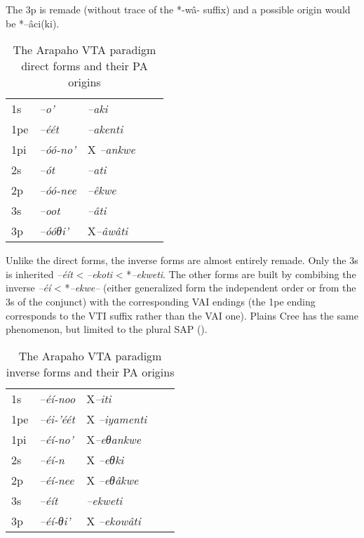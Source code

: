 \documentclass[twoside,a4paper,11pt]{article}
\newcommand{\ipa}[1]{{\phon\textit{#1}}}
\newcommand{\Σ}{\greek{Σ}}
\begin{document}
The 3p is remade (without trace of the *-wâ- suffix) and a possible origin would be *--âci(ki).

\begin{table}[H]
\caption{The Arapaho VTA paradigm direct forms and their PA origins}
\centering \label{tab:vta.1}
\begin{tabular}{lllll}
\toprule
 1s & 	\ipa{--o'} & 	\ipa{--aki} & 		\\		
1pe & 	\ipa{--éét} & 	\ipa{--akenti} & 		\\		
1pi & 	\ipa{--óó-no'} & X	\ipa{--ankwe} & 		\\		
\midrule
2s & 	\ipa{--ót} & 	\ipa{--ati} & 		\\		
2p & 	\ipa{--óó-nee} & 	\ipa{--êkwe} & 		\\		
\midrule
3s & 	\ipa{--oot} & 	\ipa{--âti} & 		\\		
3p & 	\ipa{--óóθi'} & 	X\ipa{--âwâti} & 		\\		
\bottomrule
\end{tabular}
\end{table}

Unlike the direct forms, the inverse forms are almost entirely remade. Only the 3s is inherited 	\ipa{--éít} <   	\ipa{--ekoti} < *\ipa{--ekweti}. The other forms are built by combibing the inverse 	\ipa{--éí} < *\ipa{--ekwe--} (either generalized form the independent order or from the 3s of the conjunct) with the corresponding VAI endings (the 1pe ending corresponds to the VTI suffix rather than the VAI one). Plains Cree has the same phenomenon, but limited to the plural SAP (\citealt{dahlstrom89change}).



\begin{table}[H]
\caption{The Arapaho VTA paradigm inverse forms and their PA origins}
\centering \label{tab:vta.2}
\begin{tabular}{lllll}
\toprule
1s & 	\ipa{--éí-noo} & 	X\ipa{--iti} & 		\\
1pe & 	\ipa{--éi-'éét} & X	\ipa{--iyamenti} & 		\\
1pi & 	\ipa{--éí-no'} & 	X\ipa{--eθankwe} & 		\\
\midrule
2s & 	\ipa{--éí-n} & X	\ipa{--eθki} & 		\\
2p & 	\ipa{--éí-nee} & X	\ipa{--eθâkwe} & 		\\
\midrule
3s & 	\ipa{--éít} & 	\ipa{--ekweti} & 		\\
3p & 	\ipa{--éí-θi'} & X	\ipa{--ekowâti} & 		\\
\bottomrule
\end{tabular}
\end{table}
 
\end{document}

